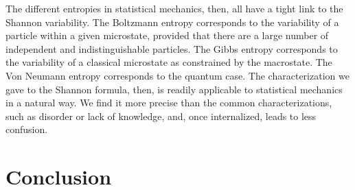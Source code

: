 \documentclass{article}
\begin{document}
The different entropies in statistical mechanics, then, all have a tight link to the Shannon variability. The Boltzmann entropy corresponds to the variability of a particle within a given microstate, provided that there are a large number of independent and indistinguishable particles. The Gibbs entropy corresponds to the variability of a classical microstate as constrained by the macrostate. The Von Neumann entropy corresponds to the quantum case. The characterization we gave to the Shannon formula, then, is readily applicable to statistical mechanics in a natural way. We find it more precise than the common characterizations, such as disorder or lack of knowledge, and, once internalized, leads to less confusion.


\section{Conclusion}

  

\end{document}
